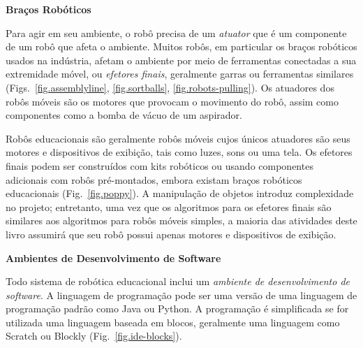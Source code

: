 
\smallskip

\noindent\textbf{Braços Robóticos}

Para agir em seu ambiente, o robô precisa de um \emph{atuator} que é um componente de um robô que afeta o ambiente. Muitos robôs, em particular os braços robóticos usados na indústria, afetam o ambiente por meio de ferramentas conectadas a sua extremidade móvel, ou \emph{efetores finais}, geralmente garras ou ferramentas similares (Figs.~\ref{fig.assemblyline}, \ref{fig.sortballs}, \ref{fig.robots-pulling}). Os atuadores dos robôs móveis são os motores que provocam o movimento do robô, assim como componentes como a bomba de vácuo de um aspirador.

Robôs educacionais são geralmente robôs móveis cujos únicos atuadores são seus motores e dispositivos de exibição, tais como luzes, sons ou uma tela. Os efetores finais podem ser construídos com kits robóticos ou usando componentes adicionais com robôs pré-montados, embora existam braços robóticos educacionais (Fig.~\ref{fig.poppy}). A manipulação de objetos introduz complexidade no projeto; entretanto, uma vez que os algoritmos para os efetores finais são similares aos algoritmos para robôs móveis simples, a maioria das atividades deste livro assumirá que seu robô possui apenas motores e dispositivos de exibição.

\smallskip

\noindent\textbf{Ambientes de Desenvolvimento de Software}

Todo sistema de robótica educacional inclui um \emph{ambiente de desenvolvimento de software}. A linguagem de programação pode ser uma versão de uma linguagem de programação padrão como Java ou Python. A programação é simplificada se for utilizada uma linguagem baseada em blocos, geralmente uma linguagem como Scratch ou Blockly (Fig.~\ref{fig.ide-blocks}).

